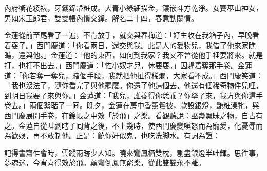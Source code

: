 內府衢花綾裱，牙籤錦帶粧成。大青小綠細描金，鑲嵌斗方乾淨。女賽巫山神女，男如宋玉郎君，雙雙帳內慣交鋒。解名二十四，春意動關情。

金蓮從前至尾看了一遍，不肯放手，就交與春梅道：「好生收在我箱子內，早晚看着耍子。」{}西門慶道：「你看兩日，還交與我。此是人的愛物兒，我借了他來家瞧瞧，還與他。」金蓮道：「他的東西，如何到我家？我又不曾從他手裡要將來。就是打，也打不出去。」{}西門慶道：「恠小奴才兒，休要耍。」因趕着奪那手卷。金蓮道：「你若奪一奪兒，賭個手段，我就把他扯得稀爛，大家看不成。」{}西門慶笑道：「我也沒法了，隨你看完了與他罷麼。你還了他這個去，他還有個稀奇物件兒哩，到明日我要了來與你。」金蓮道：「我兒，誰養得你恁乖？{}你拏了來，我方與你這手卷去。」兩個絮聒了一囘。晚夕，金蓮在房中香薰鴛被，款設銀燈，艷粧澡牝，與西門慶展開手卷，在錦帳之中效「於飛」之樂。{}看觀聽說：巫蠱魘昧之物，自古有之。金蓮自從叫劉瞎子囘背之後，不上幾時，使西門慶變嗔怒而為寵愛，化憂辱而為歡娛，再不敢制他。正是：饒你奸似鬼，也吃洗脚水。有詞為證：

記得書齋乍會時，雲蹤雨跡少人知。曉來鸞鳳栖雙枕，剔盡銀燈半吐輝。思徃事，夢魂迷，今宵喜得效於飛。顛鸞倒鳳無窮樂，從此雙雙永不離。

 

